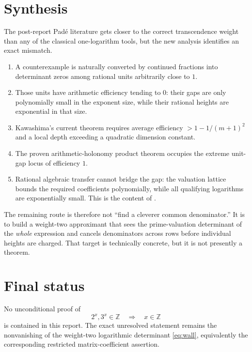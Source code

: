 \documentclass[11pt]{article}
\theoremstyle{definition}
\newcommand{\Z}{\mathbb Z}
\begin{document}
\section{Synthesis}

The post-report Pad\'e literature gets closer to the correct transcendence weight than any of
the classical one-logarithm tools, but the new analysis identifies an exact mismatch.

\begin{enumerate}[label=\textbf{\alph*.}]
\item A counterexample is naturally converted by continued fractions into determinant zeros
      among rational units arbitrarily close to $1$.
\item Those units have arithmetic efficiency tending to $0$: their gaps are only polynomially
      small in the exponent size, while their rational heights are exponential in that size.
\item Kawashima's current theorem requires average efficiency
      $>1-1/(m+1)^2$ and a local depth exceeding a quadratic dimension constant.
\item The proven arithmetic-holonomy product theorem occupies the extreme unit-gap locus of
      efficiency $1$.
\item Rational algebraic transfer cannot bridge the gap: the valuation lattice bounds the
      required coefficients polynomially, while all qualifying logarithms are exponentially
      small.  This is the content of .
\end{enumerate}

The remaining route is therefore not ``find a cleverer common denominator.''  It is to build a
weight-two approximant that sees the prime-valuation determinant of the \emph{whole} expression
and cancels denominators across rows before individual heights are charged.  That target is
technically concrete, but it is not presently a theorem.

\section{Final status}

\begin{conditionalbox}
No unconditional proof of
\[
  2^x,3^x\in\Z\quad\Longrightarrow\quad x\in\Z
\]
is contained in this report.  The exact unresolved statement remains the nonvanishing of the
weight-two logarithmic determinant \eqref{eq:wall}, equivalently the corresponding restricted
matrix-coefficient assertion.
\end{conditionalbox}
\end{document}
